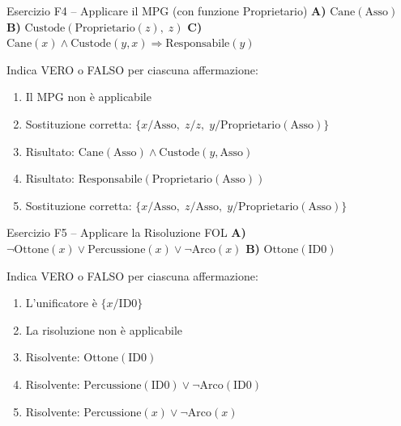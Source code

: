 \documentclass[12pt,a4paper]{article}
\begin{document}
\begin{vfbox}{Esercizio F4 -- Applicare il MPG (con funzione Proprietario)}
\textbf{A)} $\text{Cane}(\text{Asso})$ \qquad
\textbf{B)} $\text{Custode}(\text{Proprietario}(z),\; z)$ \qquad
\textbf{C)} $\text{Cane}(x) \land \text{Custode}(y, x) \Rightarrow \text{Responsabile}(y)$
\smallskip

Indica VERO o FALSO per ciascuna affermazione:
\begin{enumerate}[label=\arabic*.]
  \item Il MPG non è applicabile \hfill \underline{\hspace{2cm}}
  \item Sostituzione corretta: $\{x/\text{Asso},\; z/z,\; y/\text{Proprietario}(\text{Asso})\}$ \hfill \underline{\hspace{2cm}}
  \item Risultato: $\text{Cane}(\text{Asso}) \land \text{Custode}(y, \text{Asso})$ \hfill \underline{\hspace{2cm}}
  \item Risultato: $\text{Responsabile}(\text{Proprietario}(\text{Asso}))$ \hfill \underline{\hspace{2cm}}
  \item Sostituzione corretta: $\{x/\text{Asso},\; z/\text{Asso},\; y/\text{Proprietario}(\text{Asso})\}$ \hfill \underline{\hspace{2cm}}
\end{enumerate}
\end{vfbox}

\begin{vfbox}{Esercizio F5 -- Applicare la Risoluzione FOL}
\textbf{A)} $\neg\text{Ottone}(x) \lor \text{Percussione}(x) \lor \neg\text{Arco}(x)$ \qquad
\textbf{B)} $\text{Ottone}(\text{ID0})$
\smallskip

Indica VERO o FALSO per ciascuna affermazione:
\begin{enumerate}[label=\arabic*.]
  \item L'unificatore è $\{x/\text{ID0}\}$ \hfill \underline{\hspace{2cm}}
  \item La risoluzione non è applicabile \hfill \underline{\hspace{2cm}}
  \item Risolvente: $\text{Ottone}(\text{ID0})$ \hfill \underline{\hspace{2cm}}
  \item Risolvente: $\text{Percussione}(\text{ID0}) \lor \neg\text{Arco}(\text{ID0})$ \hfill \underline{\hspace{2cm}}
  \item Risolvente: $\text{Percussione}(x) \lor \neg\text{Arco}(x)$ \hfill \underline{\hspace{2cm}}
\end{enumerate}
\end{vfbox}
\end{document}
